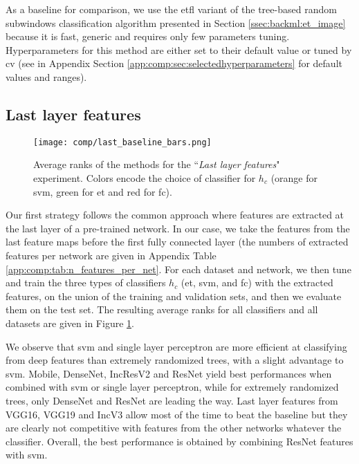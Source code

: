As a baseline for comparison, we use the \acrshort{etfl} variant of the tree-based random subwindows classification algorithm presented in Section \ref{ssec:backml:et_image} because it is fast, generic and requires only few parameters tuning. Hyperparameters for this method are either set to their default value or tuned by \acrlong{cv} (see in Appendix Section \ref{app:comp:sec:selectedhyperparameters} for default values and ranges).

\subsection{Last layer features}
\label{ssec:comp:exp_last_layer}

\begin{figure}
    \centering
    \texttt{[image: comp/last\_baseline\_bars.png]}
    \caption{Average ranks of the methods for the ``\textit{Last layer features}" experiment. Colors encode the choice of classifier for $h_c$ (orange for \acrshort{svm}, green for \acrshort{et} and red for \acrshort{fc}).}
    \label{fig:comp:avg_ranks_last_layer}
\end{figure}

Our first strategy follows the common approach where features are extracted at the last layer of a pre-trained network. In our case, we take the features from the last feature maps before the first fully connected layer (the numbers of extracted features per network are given in Appendix Table \ref{app:comp:tab:n_features_per_net}. For each dataset and network, we then tune and train the three types of classifiers $h_c$ (\acrshort{et}, \acrshort{svm}, and \acrshort{fc}) with the extracted features, on the union of the training and validation sets, and then we evaluate them on the test set. The resulting average ranks for all classifiers and all datasets are given in Figure \ref{fig:comp:avg_ranks_last_layer}.

We observe that \acrshort{svm} and single layer perceptron are more efficient at classifying from deep features than extremely randomized trees, with a slight advantage to \acrshort{svm}. Mobile, DenseNet, IncResV2 and ResNet yield best performances when combined with \acrshort{svm} or single layer perceptron, while for extremely randomized trees, only DenseNet and ResNet are leading the way. Last layer features from VGG16, VGG19 and IncV3 allow most of the time to beat the baseline but they are clearly not competitive with features from the other networks whatever the classifier. Overall, the best performance is obtained by combining ResNet features with \acrshort{svm}.

